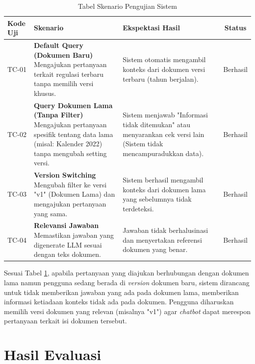 \begin{table}[h!]
    \centering
    \caption{Tabel Skenario Pengujian Sistem}
    \label{tab:skenario_pengujian}
    \renewcommand{\arraystretch}{1.3}
    \begin{tabular}{|p{1.5cm}|p{4.5cm}|p{5cm}|c|}
        \hline
        \textbf{Kode Uji} & \textbf{Skenario} & \textbf{Ekspektasi Hasil} & \textbf{Status} \\ \hline
        TC-01 & \textbf{Default Query (Dokumen Baru)} \newline Mengajukan pertanyaan terkait regulasi terbaru tanpa memilih versi khusus. & Sistem otomatis mengambil konteks dari dokumen versi terbaru (tahun berjalan). & Berhasil \\ \hline
        TC-02 & \textbf{Query Dokumen Lama (Tanpa Filter)} \newline Mengajukan pertanyaan spesifik tentang data lama (misal: Kalender 2022) tanpa mengubah setting versi. & Sistem menjawab "Informasi tidak ditemukan" atau menyarankan cek versi lain (Sistem tidak mencampuradukkan data). & Berhasil \\ \hline
        TC-03 & \textbf{Version Switching} \newline Mengubah filter ke versi "v1" (Dokumen Lama) dan mengajukan pertanyaan yang sama. & Sistem berhasil mengambil konteks dari dokumen lama yang sebelumnya tidak terdeteksi. & Berhasil \\ \hline
        TC-04 & \textbf{Relevansi Jawaban} \newline Memastikan jawaban yang digenerate LLM sesuai dengan teks dokumen. & Jawaban tidak berhalusinasi dan menyertakan referensi dokumen yang benar. & Berhasil \\ \hline
    \end{tabular}
\end{table}

Sesuai Tabel \ref{tab:skenario_pengujian}, apabila pertanyaan yang diajukan berhubungan dengan dokumen lama namun pengguna sedang berada di \textit{version} dokumen baru, sistem dirancang untuk tidak memberikan jawaban yang ada pada dokumen lama, memberikan informasi ketiadaan konteks tidak ada pada dokumen. 
Pengguna diharuskan memilih versi dokumen yang relevan (misalnya "v1") agar \textit{chatbot} dapat merespon pertanyaan terkait isi dokumen tersebut.

\newpage
\section{Hasil Evaluasi}
\label{sec:hasil_evaluasi}

